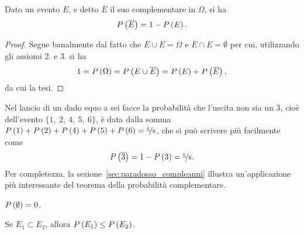 \begin{theorem}
  Dato un evento $E$, e detto $\overline{E}$ il suo complementare in $\Omega$,
  si ha
  \begin{align}\label{eq:probabilita_complementare}
    \displaystyle P\left(\overline{E}\right) = 1 - \displaystyle P\left(E\right).
  \end{align}
\end{theorem}
\begin{proof}
  Segue banalmente dal fatto che $\overline{E} \cup E = \Omega$ e
  $\overline{E} \cap E = \emptyset$ per cui, utilizzando gli assiomi 2. e
  3. si ha
  \begin{align*}
    1 = \displaystyle P\left(\Omega\right) = \displaystyle P\left(E \cup \overline{E}\right) =
    \displaystyle P\left(E\right) + \displaystyle P\left(\overline{E}\right),
  \end{align*}
  da cui la tesi.
\end{proof}

\begin{examplebox}
  \begin{example}
    Nel lancio di un dado equo a sei facce la probabilità che l'uscita non
    sia un $3$, cioè dell'evento $\{1,~2,~4,~5,~6\}$, è data dalla somma
    $\displaystyle P\left(1\right) + \displaystyle P\left(2\right) + \displaystyle P\left(4\right) + \displaystyle P\left(5\right) + \displaystyle P\left(6\right) = \nicefrac{5}{6}$,
    che si può scrivere più facilmente come
    $$
    \displaystyle P\left(\overline{3}\right) = 1 - \displaystyle P\left(3\right) = \nicefrac{5}{6}.
    $$
    Per completezza, la sezione~\ref{sec:paradosso_compleanni} illustra
    un'applicazione più interessante del teorema della probabilità
    complementare.
  \end{example}
\end{examplebox}


\begin{corollary}
  $\displaystyle P\left(\emptyset\right) = 0$.
\end{corollary}

\begin{corollary}
  Se $E_1 \subset E_2$, allora $\displaystyle P\left(E_1\right) \leq \displaystyle P\left(E_2\right)$.
\end{corollary}

\begin{figure}[!htbp]
\end{figure}

